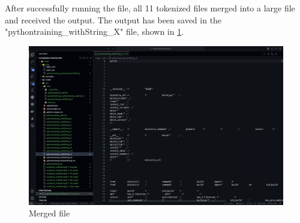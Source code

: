After successfully running the file, all 11 tokenized files merged into a large file and received the output. The output has been saved in the "pythontraining\_withString\_X" file, shown in \ref{fig: Figure7}.
\begin{figure}
    \centering
    \includegraphics[width=1\linewidth]{pictures/merged_files.png}
    \caption{Merged file}
    \label{fig: Figure7}
\end{figure}

